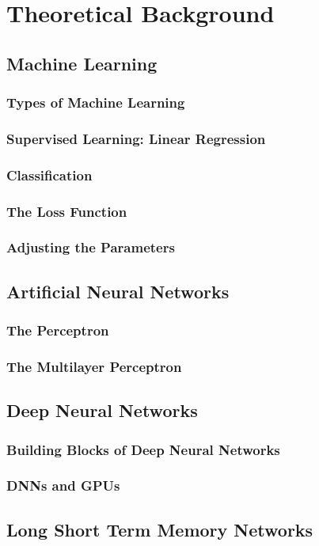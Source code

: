 \section{Theoretical Background}

\subsection{Machine Learning}
\subsubsection{Types of Machine Learning}
\subsubsection{Supervised Learning: Linear Regression}
\subsubsection{Classification}
\subsubsection{The Loss Function}
\subsubsection{Adjusting the Parameters}


\subsection{Artificial Neural Networks}
\subsubsection{The Perceptron}
\subsubsection{The Multilayer Perceptron}


\subsection{Deep Neural Networks}
\subsubsection{Building Blocks of Deep Neural Networks}
\subsubsection{DNNs and GPUs}

\subsection{Long Short Term Memory Networks}
